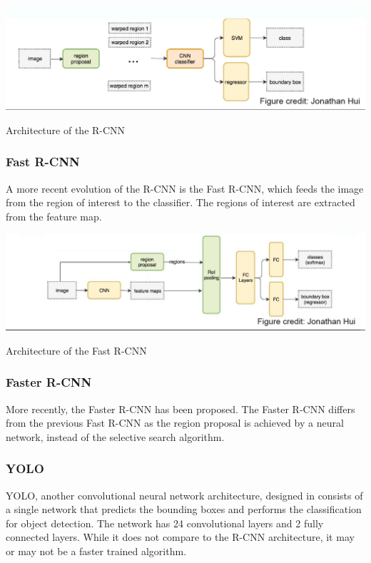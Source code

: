 \begin{table}[!ht]
  \includegraphics[width=\textwidth]{figs/r-cnn.png}
  \caption{Architecture of the R-CNN}
  \label{fig:rcnn}
\end{table}

\subsubsection{Fast R-CNN}\label{subsection:od_fastRcnn}
A more recent evolution of the R-CNN is the Fast R-CNN, which feeds the image from the region of interest to the classifier.  
The regions of interest are extracted from the feature map.  

\begin{table}[!ht]
  \includegraphics[width=\textwidth]{figs/fast_r-cnn.png}
  \caption{Architecture of the Fast R-CNN}
  \label{fig:fast_rcnn}
\end{table}

\subsubsection{Faster R-CNN}
More recently, the Faster R-CNN has been proposed.  
The Faster R-CNN differs from the previous Fast R-CNN as the region proposal is achieved by a neural network, instead of the selective search algorithm.

\subsubsection{YOLO}
YOLO, another convolutional neural network architecture, designed in \cite{DBLP:journals/corr/RedmonDGF15} consists of a single network that predicts the bounding boxes and performs the classification for object detection. 
The network has 24 convolutional layers and 2 fully connected layers.  
While it does not compare to the R-CNN architecture, it may or may not be a faster trained algorithm.

